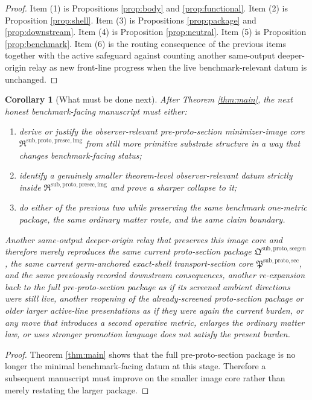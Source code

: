 \documentclass[11pt]{article}
\newcommand{\ProtoSectionCore}{\mathfrak P^{\mathrm{sub,proto,sec}}}
\newcommand{\ProtoSectionPackage}{\mathfrak Q^{\mathrm{sub,proto,secgen}}}
\newcommand{\PreProtoSectionImageCore}{\mathfrak R^{\mathrm{sub,proto,presec,img}}}
\newtheorem{corollary}{Corollary}
\begin{document}
\begin{proof}
Item (1) is Propositions \ref{prop:body} and \ref{prop:functional}. Item (2) is Proposition \ref{prop:shell}. Item (3) is Propositions \ref{prop:package} and \ref{prop:downstream}. Item (4) is Proposition \ref{prop:neutral}. Item (5) is Proposition \ref{prop:benchmark}. Item (6) is the routing consequence of the previous items together with the active safeguard against counting another same-output deeper-origin relay as new front-line progress when the live benchmark-relevant datum is unchanged.
\end{proof}

\begin{corollary}[What must be done next]
\label{cor:next}
After Theorem \ref{thm:main}, the next honest benchmark-facing manuscript must either:
\begin{enumerate}
    \item derive or justify the observer-relevant pre-proto-section minimizer-image core \(\PreProtoSectionImageCore\) from still more primitive substrate structure in a way that changes benchmark-facing status;
    \item identify a genuinely smaller theorem-level observer-relevant datum strictly inside \(\PreProtoSectionImageCore\) and prove a sharper collapse to it;
    \item do either of the previous two while preserving the same benchmark one-metric package, the same ordinary matter route, and the same claim boundary.
\end{enumerate}
Another same-output deeper-origin relay that preserves this image core and therefore merely reproduces the same current proto-section package \(\ProtoSectionPackage\), the same current germ-anchored exact-shell transport-section core \(\ProtoSectionCore\), and the same previously recorded downstream consequences, another re-expansion back to the full pre-proto-section package as if its screened ambient directions were still live, another reopening of the already-screened proto-section package or older larger active-line presentations as if they were again the current burden, or any move that introduces a second operative metric, enlarges the ordinary matter law, or uses stronger promotion language does not satisfy the present burden.
\end{corollary}

\begin{proof}
Theorem \ref{thm:main} shows that the full pre-proto-section package is no longer the minimal benchmark-facing datum at this stage. Therefore a subsequent manuscript must improve on the smaller image core rather than merely restating the larger package.
\end{proof}
\end{document}

